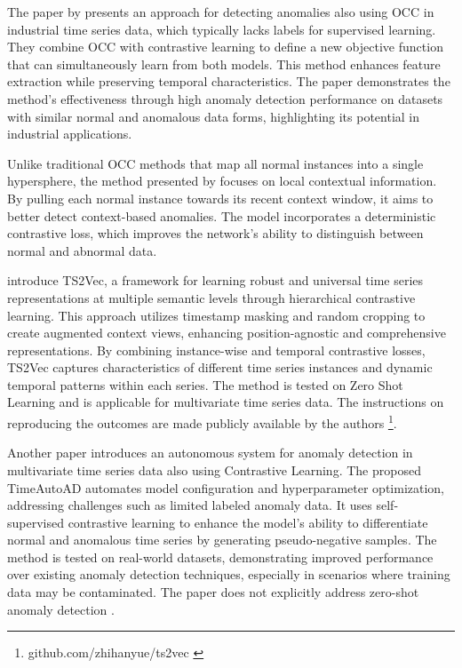 %
The paper by \cite{lee_time_2023} presents an approach for detecting anomalies also using OCC in industrial time series data, which typically lacks labels for supervised learning. They combine OCC with contrastive learning to define a new objective function that can simultaneously learn from both models. This method enhances feature extraction while preserving temporal characteristics. The paper demonstrates the method's effectiveness through high anomaly detection performance on datasets with similar normal and anomalous data forms, highlighting its potential in industrial applications.

Unlike traditional OCC methods that map all normal instances into a single hypersphere, the method presented by \cite{chen_time-series_2023} focuses on local contextual information. By pulling each normal instance towards its recent context window, it aims to better detect context-based anomalies. The model incorporates a deterministic contrastive loss, which improves the network's ability to distinguish between normal and abnormal data.

\cite{yue_ts2vec_2022} introduce TS2Vec, a framework for learning robust and universal time series representations at multiple semantic levels through hierarchical contrastive learning. This approach utilizes timestamp masking and random cropping to create augmented context views, enhancing position-agnostic and comprehensive representations. By combining instance-wise and temporal contrastive losses, TS2Vec captures characteristics of different time series instances and dynamic temporal patterns within each series. The method is tested on Zero Shot Learning and is applicable for multivariate time series data. The instructions on reproducing the outcomes are made publicly available by the authors \footnote{\fussy\tiny github.com/zhihanyue/ts2vec \label{foot_ts2vec}}.

Another paper introduces an autonomous system for anomaly detection in multivariate time series data also using Contrastive Learning. The proposed TimeAutoAD automates model configuration and hyperparameter optimization, addressing challenges such as limited labeled anomaly data. It uses self-supervised contrastive learning to enhance the model's ability to differentiate normal and anomalous time series by generating pseudo-negative samples. The method is tested on real-world datasets, demonstrating improved performance over existing anomaly detection techniques, especially in scenarios where training data may be contaminated. The paper does not explicitly address zero-shot anomaly detection \cite{jiao_timeautoad_2022}.

